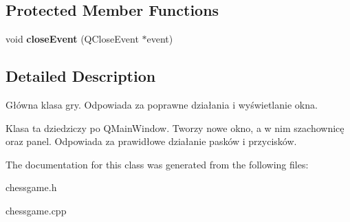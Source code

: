 \subsection*{Protected Member Functions}
\begin{DoxyCompactItemize}
\item 
\mbox{\label{classchess_game_aa030ac566950d641e55f7d5b9d249f7c}} 
void {\bfseries close\+Event} (Q\+Close\+Event $\ast$event)
\end{DoxyCompactItemize}


\subsection{Detailed Description}
Główna klasa gry. Odpowiada za poprawne działania i wyświetlanie okna. 

Klasa ta dziedziczy po Q\+Main\+Window. Tworzy nowe okno, a w nim szachownicę oraz panel. Odpowiada za prawidłowe działanie pasków i przycisków. 

The documentation for this class was generated from the following files\+:\begin{DoxyCompactItemize}
\item 
chessgame.\+h\item 
chessgame.\+cpp\end{DoxyCompactItemize}
